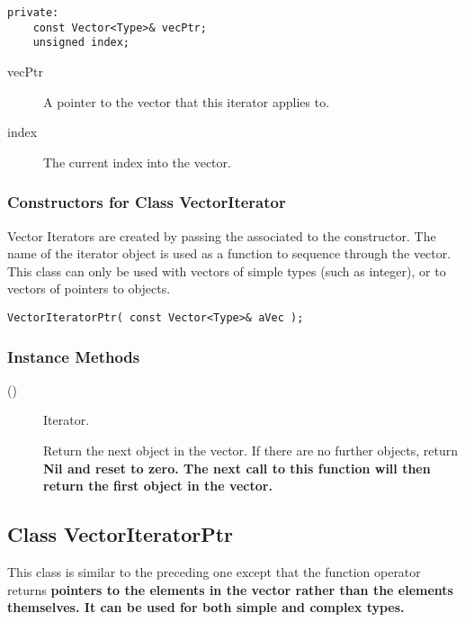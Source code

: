 \begin{verbatim}
private:
    const Vector<Type>& vecPtr;
    unsigned index;
\end{verbatim}

\begin{description}
\item[vecPtr] \texonly{---} A pointer to the vector that this iterator
  applies to.
\item[index] \texonly{---} The current index into the vector.
\end{description}


\subsubsection{Constructors for Class VectorIterator}

Vector Iterators are created by passing the associated
 to the  constructor.
The name of the iterator object is used as a function to sequence
through the vector.  This class can only be used with vectors of
simple types (such as integer), or to vectors of pointers to objects.  

\begin{verbatim}
VectorIteratorPtr( const Vector<Type>& aVec );
\end{verbatim}

\subsubsection{Instance Methods}

\begin{description}
\item[()] \texonly{---} Iterator.\\

Return the next object in the vector.  If there are no further
objects, return \bf{Nil} and reset  to zero.  The next
call to this function will then return the first object in the vector.

\end{description}

\subsection{Class VectorIteratorPtr}

This class is similar to the preceding one except that the function
operator returns \bf{pointers} to the elements in the vector rather
than the elements themselves.  It can be used for both simple and
complex types.

